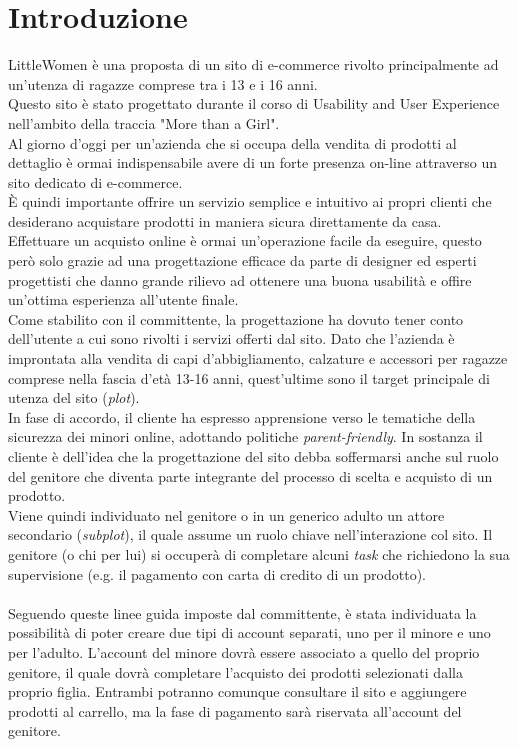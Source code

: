 \documentclass[12pt,a4paper]{report}
\begin{document}
\chapter{Introduzione}
LittleWomen è una proposta di un sito di e-commerce rivolto principalmente ad un'utenza di ragazze comprese tra i 13 e i 16 anni.\\Questo sito è stato progettato durante il corso di Usability and User Experience nell'ambito della traccia "More than a Girl".
\vspace{10mm}\\ Al giorno d'oggi per un'azienda che si occupa della vendita di prodotti al dettaglio è ormai indispensabile avere di un forte presenza on-line attraverso un sito dedicato di e-commerce.\\
È quindi importante offrire un servizio semplice e intuitivo ai propri clienti che desiderano acquistare prodotti in maniera sicura direttamente da casa.\\
Effettuare un acquisto online è ormai un'operazione facile da eseguire, questo però solo grazie ad una progettazione efficace da parte di designer ed esperti progettisti che danno grande rilievo ad ottenere una buona usabilità e offire un'ottima esperienza all'utente finale.
\vspace{10mm}\\Come stabilito con il committente, la progettazione ha dovuto tener conto dell'utente a cui sono rivolti i servizi offerti dal sito. Dato che l'azienda è improntata alla vendita di capi d'abbigliamento, calzature e accessori per ragazze comprese nella fascia d'età 13-16 anni, quest'ultime sono il target principale di utenza del sito (\textit{plot}).\\
In fase di accordo, il cliente ha espresso apprensione verso le tematiche della sicurezza dei minori online, adottando politiche \textit{parent-friendly}. In sostanza il cliente è dell'idea che la progettazione del sito debba soffermarsi anche sul ruolo del genitore che diventa parte integrante del processo di scelta e acquisto di un prodotto.
\vspace{10mm}\\Viene quindi individuato nel genitore o in un generico adulto un attore secondario (\textit{subplot}), il quale assume un ruolo chiave nell'interazione col sito.
Il genitore (o chi per lui) si occuperà di completare alcuni \textit{task} che richiedono la sua supervisione (e.g. il pagamento con carta di credito di un prodotto).\\
\vspace{10mm}\\Seguendo queste linee guida imposte dal committente, è stata individuata la possibilità di poter creare due tipi di account separati, uno per il minore e uno per l'adulto. L'account del minore dovrà essere associato a quello del proprio genitore, il quale dovrà completare l'acquisto dei prodotti selezionati dalla proprio figlia. Entrambi potranno comunque consultare il sito e aggiungere prodotti al carrello, ma la fase di pagamento sarà riservata all'account del genitore.
\end{document}
